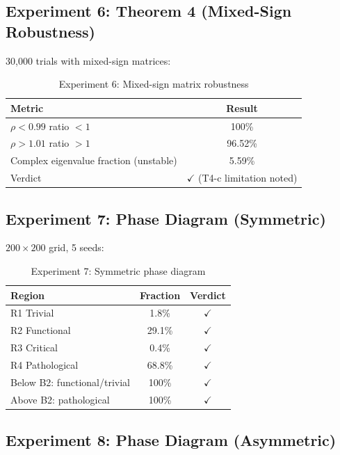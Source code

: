 \documentclass[12pt,a4paper]{article}
\theoremstyle{definition}
\begin{document}
\subsection{Experiment 6: Theorem 4 (Mixed-Sign Robustness)}

30,000 trials with mixed-sign matrices:

\begin{table}[htbp]
\centering
\caption{Experiment 6: Mixed-sign matrix robustness}
\label{tab:exp6-en}
\begin{tabular}{lc}
\toprule
Metric & Result \\
\midrule
$\rho < 0.99$ ratio $< 1$ & 100\% \\
$\rho > 1.01$ ratio $> 1$ & 96.52\% \\
Complex eigenvalue fraction (unstable) & 5.59\% \\
\midrule
Verdict & $\checkmark$ (T4-c limitation noted) \\
\bottomrule
\end{tabular}
\end{table}

\subsection{Experiment 7: Phase Diagram (Symmetric)}

$200 \times 200$ grid, 5 seeds:

\begin{table}[htbp]
\centering
\caption{Experiment 7: Symmetric phase diagram}
\label{tab:exp7-en}
\begin{tabular}{lcc}
\toprule
Region & Fraction & Verdict \\
\midrule
R1 Trivial & 1.8\% & $\checkmark$ \\
R2 Functional & 29.1\% & $\checkmark$ \\
R3 Critical & 0.4\% & $\checkmark$ \\
R4 Pathological & 68.8\% & $\checkmark$ \\
\midrule
Below B2: functional/trivial & 100\% & $\checkmark$ \\
Above B2: pathological & 100\% & $\checkmark$ \\
\bottomrule
\end{tabular}
\end{table}

\subsection{Experiment 8: Phase Diagram (Asymmetric)}
\end{document}
